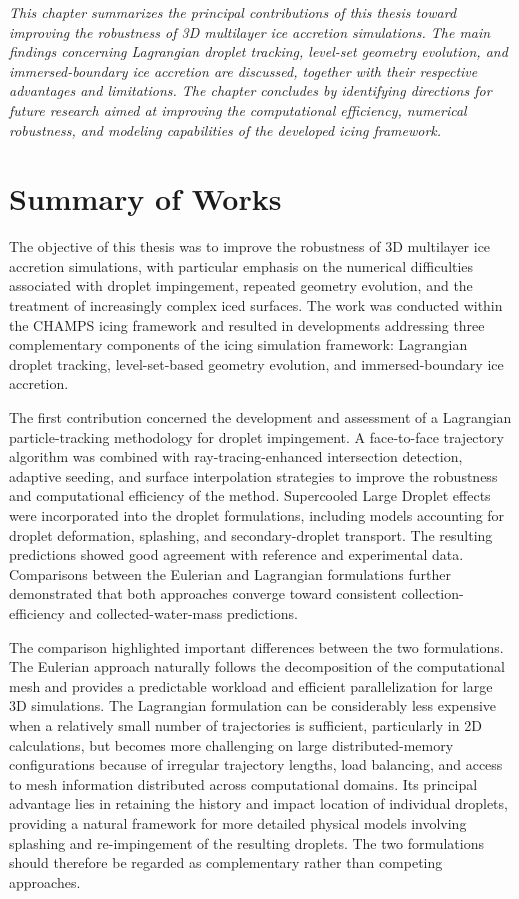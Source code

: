 \label{sec:Conclusion}

\textit{
    This chapter summarizes the principal contributions of this thesis toward improving the robustness of 3D multilayer ice accretion simulations. The main findings concerning Lagrangian droplet tracking, level-set geometry evolution, and immersed-boundary ice accretion are discussed, together with their respective advantages and limitations. The chapter concludes by identifying directions for future research aimed at improving the computational efficiency, numerical robustness, and modeling capabilities of the developed icing framework.
}

\section{Summary of Works}

The objective of this thesis was to improve the robustness of 3D multilayer ice accretion simulations, with particular emphasis on the numerical difficulties associated with droplet impingement, repeated geometry evolution, and the treatment of increasingly complex iced surfaces. The work was conducted within the \textsc{CHAMPS} icing framework and resulted in developments addressing three complementary components of the icing simulation framework: Lagrangian droplet tracking, level-set-based geometry evolution, and immersed-boundary ice accretion.

The first contribution concerned the development and assessment of a Lagrangian particle-tracking methodology for droplet impingement. A face-to-face trajectory algorithm was combined with ray-tracing-enhanced intersection detection, adaptive seeding, and surface interpolation strategies to improve the robustness and computational efficiency of the method. Supercooled Large Droplet effects were incorporated into the droplet formulations, including models accounting for droplet deformation, splashing, and secondary-droplet transport. The resulting predictions showed good agreement with reference and experimental data. Comparisons between the Eulerian and Lagrangian formulations further demonstrated that both approaches converge toward consistent collection-efficiency and collected-water-mass predictions.

The comparison highlighted important differences between the two formulations. The Eulerian approach naturally follows the decomposition of the computational mesh and provides a predictable workload and efficient parallelization for large 3D simulations. The Lagrangian formulation can be considerably less expensive when a relatively small number of trajectories is sufficient, particularly in 2D calculations, but becomes more challenging on large distributed-memory configurations because of irregular trajectory lengths, load balancing, and access to mesh information distributed across computational domains. Its principal advantage lies in retaining the history and impact location of individual droplets, providing a natural framework for more detailed physical models involving splashing and re-impingement of the resulting droplets. The two formulations should therefore be regarded as complementary rather than competing approaches.

